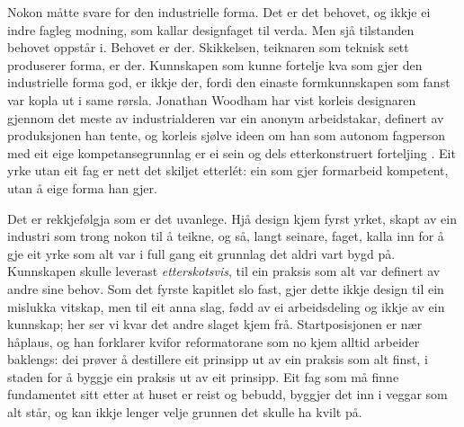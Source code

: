 Nokon måtte svare for den industrielle forma. Det er det behovet, og ikkje ei indre fagleg modning, som kallar designfaget til verda. Men sjå tilstanden behovet oppstår i. Behovet er der. Skikkelsen, teiknaren som teknisk sett produserer forma, er der. Kunnskapen som kunne fortelje kva som gjer den industrielle forma god, er ikkje der, fordi den einaste formkunnskapen som fanst var kopla ut i same rørsla. Jonathan Woodham har vist korleis designaren gjennom det meste av industrialderen var ein anonym arbeidstakar, definert av produksjonen han tente, og korleis sjølve ideen om han som autonom fagperson med eit eige kompetansegrunnlag er ei sein og dels etterkonstruert forteljing \autocite{woodham1997}. Eit yrke utan eit fag er nett det skiljet etterlét: ein som gjer formarbeid kompetent, utan å eige forma han gjer.

Det er rekkjefølgja som er det uvanlege. Hjå design kjem fyrst yrket, skapt av ein industri som trong nokon til å teikne, og så, langt seinare, faget, kalla inn for å gje eit yrke som alt var i full gang eit grunnlag det aldri vart bygd på. Kunnskapen skulle leverast \emph{etterskotsvis}, til ein praksis som alt var definert av andre sine behov. Som det fyrste kapitlet slo fast, gjer dette ikkje design til ein mislukka vitskap, men til eit anna slag, fødd av ei arbeidsdeling og ikkje av ein kunnskap; her ser vi kvar det andre slaget kjem frå. Startposisjonen er nær håplaus, og han forklarer kvifor reformatorane som no kjem alltid arbeider baklengs: dei prøver å destillere eit prinsipp ut av ein praksis som alt finst, i staden for å byggje ein praksis ut av eit prinsipp. Eit fag som må finne fundamentet sitt etter at huset er reist og bebudd, byggjer det inn i veggar som alt står, og kan ikkje lenger velje grunnen det skulle ha kvilt på.

